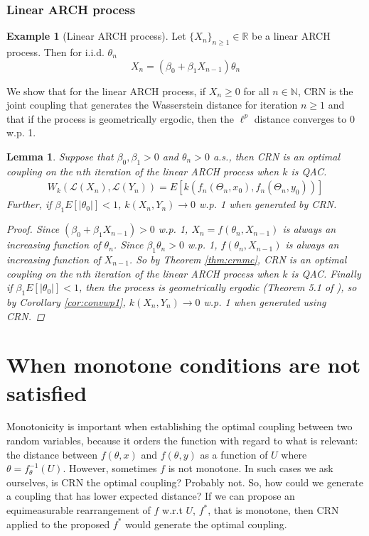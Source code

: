 \documentclass[12pt]{article}
\theoremstyle{plain}%
\newtheorem{lemma}[theorem]{Lemma}
\theoremstyle{definition}
\newtheorem{example}{Example}[section]
\begin{document}
\subsubsection{Linear ARCH process}
\begin{example}[Linear ARCH process]\label{ex:lineararch}
	Let $\{X_n\}_{n\geq 1}\in \mathbb{R}$ be a linear ARCH process. Then for i.i.d. $\theta_n$
	$$X_n = (\beta_0 +\beta_1 X_{n-1})\theta_n$$
\end{example}

We show that for the linear ARCH process, if $X_n\geq 0$ for all $n\in\mathbb{N}$, CRN is the joint coupling that generates the Wasserstein distance for iteration $n\geq 1$ and that if the process is geometrically ergodic, then the $\ell^p$ distance converges to 0 w.p. 1.
\begin{lemma}\label{lem:lineararch}
	Suppose that $\beta_0,\beta_1>0$ and $\theta_n>0$ a.s., then CRN is an optimal coupling on the $n$th iteration of the linear ARCH process when $k$ is QAC. 
	\begin{align}\label{eq:lineararch}
		W_{k}(\mathcal{L}(X_{n}), \mathcal{L}(Y_{n}))=
		E[k(f_n(\Theta_n, x_0),f_n(\Theta_n, y_0))]
	\end{align}
	Further, if $\beta_1 E[|\theta_0|]<1$, $k(X_{n},Y_{n})\to 0$ w.p. 1 when generated by CRN.
	
	\begin{proof}
		Since $(\beta_0 +\beta_1 X_{n-1})>0$ w.p. 1, $X_n=f(\theta_n,X_{n-1})$ is always an increasing function of $\theta_n$. Since $\beta_1\theta_n>0$ w.p. 1, $f(\theta_n,X_{n-1})$ is always an increasing function of $X_{n-1}$. So by Theorem \ref{thm:crnmc}, CRN is an optimal coupling on the $n$th iteration of the linear ARCH process when $k$ is QAC. 
		Finally if $\beta_1 E[|\theta_0|]<1$, then the process is geometrically ergodic (Theorem 5.1 of \cite{sixta}), so by Corollary \ref{cor:convwp1}, $k(X_{n},Y_{n})\to 0$ w.p. 1 when generated using CRN. 
	\end{proof}
\end{lemma}

\section{When monotone conditions are not satisfied}

Monotonicity is important when establishing the optimal coupling between two random variables, because it orders the function with regard to what is relevant: the distance between $f(\theta,x)$ and $f(\theta,y)$ as a function of $U$ where $\theta=f^{-1}_{\theta}(U)$. However, sometimes $f$ is not monotone. In such cases we ask ourselves, is CRN the optimal coupling? Probably not. So, how could we generate a coupling that has lower expected distance? If we can propose an equimeasurable rearrangement of $f$ w.r.t $U$, $f^*$, that is monotone, then CRN applied to the proposed $f^*$ would generate the optimal coupling.
\end{document}
